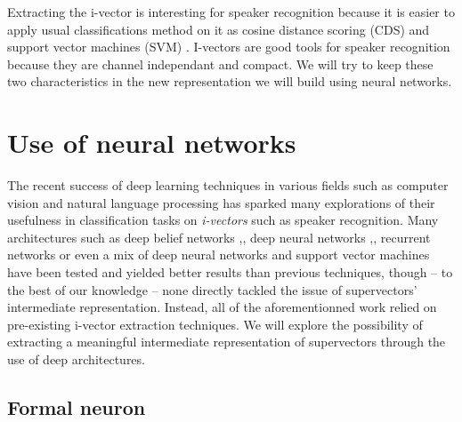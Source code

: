 \documentclass[conference]{IEEEtran}
\begin{document}
Extracting the i-vector is interesting for speaker recognition because it is
easier to apply usual classifications method on it as cosine distance scoring
(CDS) and support vector machines (SVM) \cite{Senoussaoui_ani-vector,
  dehak2011front}. I-vectors are good tools for speaker recognition because they
are channel independant and compact. We will try to keep these two
characteristics in the new representation we will build using neural networks.




\section{Use of neural networks}
\label{sec:Deep}
The recent success of deep learning techniques in various fields such as
computer vision \cite{lecun1998gradient} and natural language processing \cite{bordes2012joint} has sparked
many explorations of their usefulness in classification tasks on
\emph{i-vectors} such as speaker recognition. Many architectures such as deep
belief networks \cite{DBLP:journals/corr/GhahabiH15},\cite{ghahabi2014deep},
deep neural networks \cite{DBLP:journals/corr/GhahabiH15},\cite{ghahabi2014deep}, recurrent
networks \cite{DBLP:journals/corr/SaonSRK16} or even a mix of
deep neural networks and support vector machines \cite{richardson2015deep} have been tested and yielded
better results than previous techniques, though -- to the best of our knowledge --
none directly tackled the issue of supervectors' intermediate representation.
Instead, all of the aforementionned work relied on pre-existing i-vector
extraction techniques. We will explore the possibility of extracting a
meaningful intermediate representation of supervectors through the use of deep architectures.

\subsection{Formal neuron}

\def\layersep{2cm}
\end{document}
